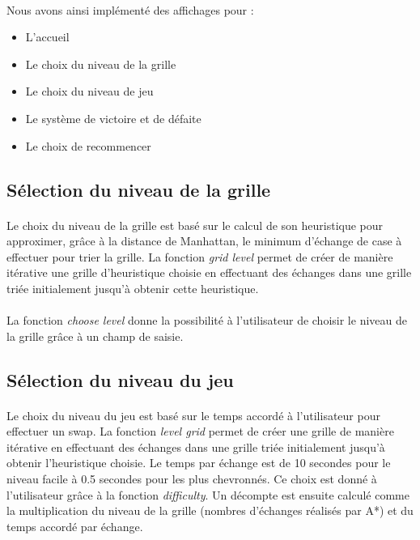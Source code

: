 \documentclass[12pt]{article}
\begin{document}
\paragraph{}
Nous avons ainsi implémenté des affichages pour :  

\begin{itemize}
    \item L'accueil
    \item Le choix du niveau de la grille
    \item Le choix du niveau de jeu
    \item Le système de victoire et de défaite
    \item Le choix de recommencer
\end{itemize}

\subsection{Sélection du niveau de la grille}
\paragraph{}
Le choix du niveau de la grille est basé sur le calcul de son heuristique pour approximer, grâce à la distance de Manhattan, le minimum d'échange de case à effectuer pour trier la grille. La fonction \textit{grid level} permet de créer de manière itérative une grille d'heuristique choisie en effectuant des échanges dans une grille triée initialement jusqu'à obtenir cette heuristique.

\paragraph{}
La fonction \textit{choose level} donne la possibilité à l'utilisateur de choisir le niveau de la grille grâce à un champ de saisie.

\subsection{Sélection du niveau du jeu}
\paragraph{}
Le choix du niveau du jeu est basé sur le temps accordé à l'utilisateur pour effectuer un swap. La fonction \textit{level grid} permet de créer une grille de manière itérative en effectuant des échanges dans une grille triée initialement jusqu'à obtenir l'heuristique choisie. Le temps par échange est de 10 secondes pour le niveau facile à 0.5 secondes pour les plus chevronnés. Ce choix est donné à l'utilisateur grâce à la fonction \textit{difficulty}. Un décompte est ensuite calculé comme la multiplication du niveau de la grille (nombres d'échanges réalisés par A*) et du temps accordé par échange.
\end{document}
